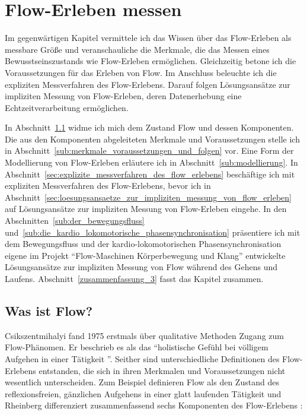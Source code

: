 \chapter{Flow-Erleben messen}
\label{cha:flow_erleben_messen}
Im gegenwärtigen Kapitel vermittele ich das Wissen über das Flow-Erleben als messbare Größe und veranschauliche die Merkmale, die das Messen eines Bewusstseinszustands wie Flow-Erleben ermöglichen. Gleichzeitig betone ich die Voraussetzungen für das Erleben von Flow. Im Anschluss beleuchte ich die expliziten Messverfahren des Flow-Erlebens. Darauf folgen Lösungsansätze zur impliziten Messung von Flow-Erleben, deren Datenerhebung eine Echtzeitverarbeitung ermöglichen.

In Abschnitt~\ref{sec:was_ist_flow} widme ich mich dem Zustand Flow und dessen Komponenten. Die aus den Komponenten abgeleiteten Merkmale und Voraussetzungen stelle ich in Abschnitt~\ref{sub:merkmale_voraussetzungen_und_folgen} vor. Eine Form der Modellierung von Flow-Erleben erläutere ich in Abschnitt~\ref{sub:modellierung}. In Abschnitt~\ref{sec:explizite_messverfahren_des_flow_erlebens} beschäftige ich mit expliziten Messverfahren des Flow-Erlebens, bevor ich in Abschnitt~\ref{sec:loesungsansaetze_zur_impliziten_messung_von_flow_erleben} auf Lösungsansätze zur impliziten Messung von Flow-Erleben eingehe. In den Abschnitten~\ref{sub:der_bewegungsfluss} und~\ref{sub:die_kardio_lokomotorische_phasensynchronisation} präsentiere ich mit dem Bewegungsfluss und der kardio-lokomotorischen Phasensynchronisation eigene im Projekt "`Flow-Maschinen Körperbewegung und Klang"' entwickelte Lösungsansätze zur impliziten Messung von Flow während des Gehens und Laufens. Abschnitt~\ref{zusammenfassung_3} fasst das Kapitel zusammen.

\section{Was ist Flow?}
\label{sec:was_ist_flow}

Csikszentmihalyi fand 1975 erstmals über qualitative Methoden Zugang zum Flow-Phänomen. Er beschrieb es als das "`holistische Gefühl bei völligem Aufgehen in einer Tätigkeit \citep[S.~58f.]{Csikszentmihalyi2010}"'. Seither sind unterschiedliche Definitionen des Flow-Erlebens entstanden, die sich in ihren Merkmalen und Voraussetzungen nicht wesentlich unterscheiden. Zum Beispiel definieren \citet[vgl.][S.~263]{Rheinberg2003} Flow als den Zustand des reflexionsfreien, gänzlichen Aufgehens in einer glatt laufenden Tätigkeit und Rheinberg differenziert zusammenfassend sechs Komponenten des Flow-Erlebens \citep[S.~153ff.]{Rheinberg2008}:

